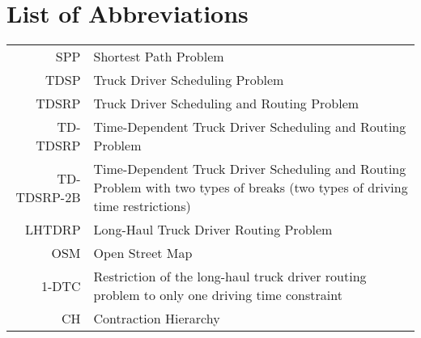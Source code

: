 

\appendix

{}	%
{}	%

\section{List of Abbreviations}
\label{app:abb}

\begin{tabular}{rp{}}
	SPP         & Shortest Path Problem                                                                                                        \\
	TDSP        & Truck Driver Scheduling Problem                                                                                              \\
	TDSRP       & Truck Driver Scheduling and Routing Problem                                                                                  \\
	TD-TDSRP    & Time-Dependent Truck Driver Scheduling and Routing Problem                                                                   \\
	TD-TDSRP-2B & Time-Dependent Truck Driver Scheduling and Routing Problem with two types of breaks (two types of driving time restrictions) \\
	LHTDRP      & Long-Haul Truck Driver Routing Problem                                                                                       \\
	OSM         & Open Street Map                                                                                                              \\
	1-DTC       & Restriction of the long-haul truck driver routing problem to only one driving time constraint                                \\
	CH          & Contraction Hierarchy                                                                                                        \\
\end{tabular}



